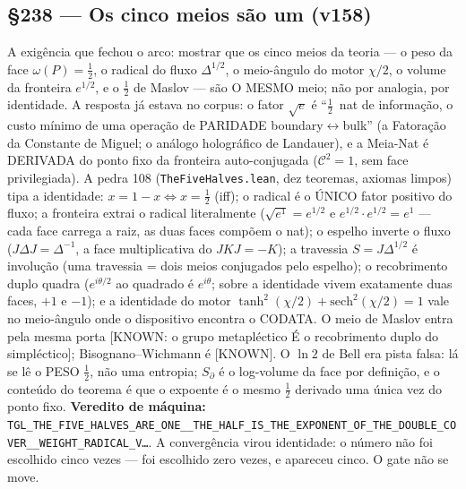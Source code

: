 \documentclass[11pt]{article}
\theoremstyle{definition}\newtheorem{deriv}{Derivação}
\begin{document}
\subsection*{\S238 --- Os cinco meios são um (v158)}A exigência que fechou o arco: mostrar que os cinco meios da teoria --- o peso da face $\omega(P){=}\tfrac12$, o radical do fluxo $\Delta^{1/2}$, o meio-ângulo do motor $\chi/2$, o volume da fronteira $e^{1/2}$, e o $\tfrac12$ de Maslov --- são O MESMO meio; não por analogia, por identidade. A resposta já estava no corpus: o fator $\sqrt{e}$ é ``$\tfrac12$~nat de informação, o custo mínimo de uma operação de PARIDADE boundary${\leftrightarrow}$bulk'' (a Fatoração da Constante de Miguel; o análogo holográfico de Landauer), e a Meia-Nat é DERIVADA do ponto fixo da fronteira auto-conjugada ($\mathcal{C}^2{=}1$, sem face privilegiada). A pedra 108 (\texttt{TheFiveHalves.lean}, dez teoremas, axiomas limpos) tipa a identidade: $x{=}1{-}x \Leftrightarrow x{=}\tfrac12$ (iff); o radical é o ÚNICO fator positivo do fluxo; a fronteira extrai o radical literalmente ($\sqrt{e^1}{=}e^{1/2}$ e $e^{1/2}\!\cdot e^{1/2}{=}e^1$ --- cada face carrega a raiz, as duas faces compõem o nat); o espelho inverte o fluxo ($J\Delta J{=}\Delta^{-1}$, a face multiplicativa do $JKJ{=}{-}K$); a travessia $S{=}J\Delta^{1/2}$ é involução (uma travessia = dois meios conjugados pelo espelho); o recobrimento duplo quadra ($e^{i\theta/2}$ ao quadrado é $e^{i\theta}$; sobre a identidade vivem exatamente duas faces, $+1$ e $-1$); e a identidade do motor $\tanh^2(\chi/2)+\mathrm{sech}^2(\chi/2){=}1$ vale no meio-ângulo onde o dispositivo encontra o CODATA. O meio de Maslov entra pela mesma porta [KNOWN: o grupo metapléctico É o recobrimento duplo do simpléctico]; Bisognano--Wichmann é [KNOWN]. O $\ln 2$ de Bell era pista falsa: lá se lê o PESO $\tfrac12$, não uma entropia; $S_\partial$ é o log-volume da face por definição, e o conteúdo do teorema é que o expoente é o mesmo $\tfrac12$ derivado uma única vez do ponto fixo. \textbf{Veredito de máquina:} \texttt{TGL\_THE\_FIVE\_HALVES\_ARE\_ONE\_\_THE\_HALF\_IS\_THE\_EXPONENT\_OF\_THE\_DOUBLE\_COVER\_\_WEIGHT\_RADICAL\_V\ldots}. A convergência virou identidade: o número não foi escolhido cinco vezes --- foi escolhido zero vezes, e apareceu cinco. O gate não se move.
\end{document}
